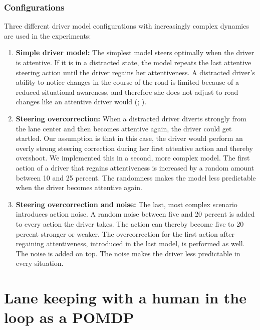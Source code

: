 
\subsubsection{Configurations}
\label{sec:driver_model_config}

Three different driver model configurations with increasingly complex dynamics are used in the experiments:
\begin{enumerate}
    \item \textbf{Simple driver model:} The simplest model steers optimally when the driver is attentive. If it is in a distracted state, the model repeats the last attentive steering action until the driver regains her attentiveness. A distracted driver's ability to notice changes in the course of the road is limited because of a reduced situational awareness, and therefore she does not adjust to road changes like an attentive driver would (\cite{driver-awareness}; \cite{driver-awareness2}).
    
    \item \textbf{Steering overcorrection:} When a distracted driver diverts strongly from the lane center and then becomes attentive again, the driver could get startled. Our assumption is that in this case, the driver would perform an overly strong steering correction during her first attentive action and thereby overshoot. We implemented this in a second, more complex model. The first action of a driver that regains attentiveness is increased by a random amount between 10 and 25 percent. The randomness makes the model less predictable when the driver becomes attentive again.
    \item \textbf{Steering overcorrection and noise:} The last, most complex scenario introduces action noise. A random noise between five and 20 percent is added to every action the driver takes. The action can thereby become five to 20 percent stronger or weaker. The overcorrection for the first action after regaining attentiveness, introduced in the last model, is performed as well. The noise is added on top. The noise makes the driver less predictable in every situation.
\end{enumerate}


\section{Lane keeping with a human in the loop as a POMDP}
\label{sec:lane_keeping_loop}

